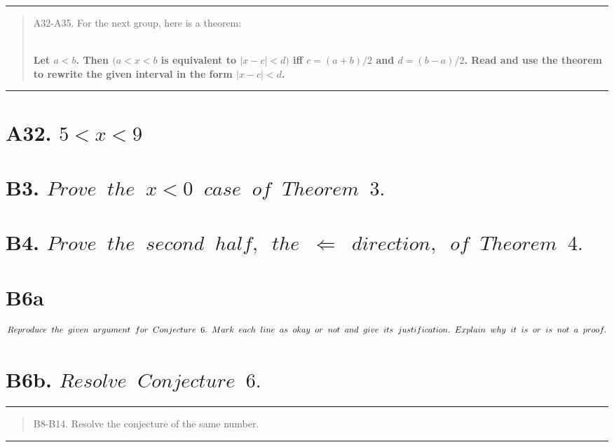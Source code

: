 \bgroup
\color{abs}
\hrule
\egroup

\begin{abstract}
	A32-A35. For the next group, here is a theorem: 
	
	\textbf{
	\\
	Let $a<b$.
	Then $(a<x<b$ is equivalent to $|x-c|<d)$ iff $c=(a+b)/2$
	and $d=(b-a)/2$. Read and use the theorem to rewrite
	the given interval in the form $|x-c|<d$.
	}

\noindent\textbf{}

\end{abstract}

\bgroup
\color{abs}
\hrule
\egroup

\section*{A32. $5<x<9$}

\section*{B3. $Prove \;\; the \;\; x<0 \;\; case \;\; of \;\;  Theorem \;\; 3.$}

\section*{B4. $Prove \;\; the \;\; second \;\; half, \;\; the \;\; \Leftarrow \;\; direction, \;\; of \;\; Theorem \;\; 4.$}

\section*{B6a $Reproduce \;\; the \;\; given \;\; argument \;\; for \;\; Conjecture \;\; 6. \;\; Mark \;\; each \;\; line \;\; as \;\; okay \;\; or
\\
\;\; not \;\; and \;\; give \;\; its \;\; justification. \;\; Explain \;\; why \;\; it \;\; is \;\; or \;\; is \;\; not \;\; a \;\; proof.$}

\section*{B6b. $Resolve \;\; Conjecture \;\; 6.$}

\bgroup
\color{abs}
\hrule
\egroup

\begin{abstract}
	B8-B14. Resolve the conjecture of the same number.
	
	\noindent\textbf{}
	
\end{abstract}
\bgroup
\color{abs}
\hrule
\egroup

